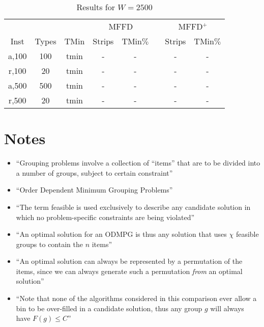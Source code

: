 \documentclass{elsarticle}
\begin{document}
\begin{table}[h!]
	\centering
	\caption{Results for $W=2500$}
	\begin{tabular}{cccccccc}\toprule
		& & &\multicolumn{2}{c}{MFFD} &\phantom{a}& \multicolumn{2}{c}{MFFD$^+$}\\
		\cmidrule{4-5} \cmidrule{7-8}
		Inst & Types &TMin & Strips & TMin$\%$ && Strips & TMin$\%$\\ \midrule	
		a,100 & 100 & tmin & - & - && - & - \\
		r,100 & 20 & tmin & - & - && - & -\\
		\midrule
		a,500 & 500 & tmin & - & - && - & -\\
		r,500 & 20 & tmin & - & - && - & -\\
		\bottomrule
	\end{tabular}	
	\label{table:MFFD2500}
\end{table}

\section{Notes}
\begin{itemize}
	\item ``Grouping problems involve a collection of ``items'' that are to be divided into a number of groups, subject to certain constraint'' \cite{lewis2009}
	\item ``Order Dependent Minimum Grouping Problems'' \cite{lewis2009}
	\item ``The term feasible is used exclusively to describe any candidate solution in which no problem-specific constraints are being violated'' \cite{lewis2009}
	\item ``An optimal solution for an ODMPG is thus any solution that uses $\chi$ feasible groups to contain the $n$ items'' \cite{lewis2009}
	\item ``An optimal solution can always be represented by a permutation of the items, since we can always generate such a permutation \textit{from} an optimal solution'' \cite{lewis2009}
	\item ``Note that none of the algorithms considered in this comparison ever allow a bin to be over-filled in a candidate solution, thus any group $g$ will always have $F(g) \leq C$'' \cite{lewis2009}
\end{itemize}
\end{document}
